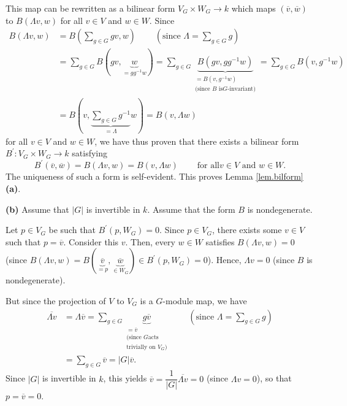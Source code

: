 \documentclass
[numbers=enddot,12pt,final,onecolumn,german,notitlepage]{scrartcl}%
\theoremstyle{definition}
\begin{document}
This map can be rewritten as a bilinear form $V_{G}\times W_{G}\rightarrow k$
which maps $\left(  \overline{v},\overline{w}\right)  $ to $B\left(  \Lambda
v,w\right)  $ for all $v\in V$ and $w\in W$. Since
\begin{align*}
B\left(  \Lambda v,w\right)   &  =B\left(  \sum\limits_{g\in G}gv,w\right)
\ \ \ \ \ \ \ \ \ \ \left(  \text{since }\Lambda=\sum\limits_{g\in G}g\right)
\\
&  =\sum\limits_{g\in G}B\left(  gv,\underbrace{w}_{=gg^{-1}w}\right)
=\sum\limits_{g\in G}\underbrace{B\left(  gv,gg^{-1}w\right)  }%
_{\substack{=B\left(  v,g^{-1}w\right)  \\\text{(since }B\text{ is
}G\text{-invariant)}}}=\sum\limits_{g\in G}B\left(  v,g^{-1}w\right) \\
&  =B\left(  v,\underbrace{\sum\limits_{g\in G}g^{-1}}_{=\Lambda}w\right)
=B\left(  v,\Lambda w\right)
\end{align*}
for all $v\in V$ and $w\in W$, we have thus proven that there exists a
bilinear form $B^{\prime}:V_{G}\times W_{G}\rightarrow k$ satisfying%
\[
B^{\prime}\left(  \overline{v},\overline{w}\right)  =B\left(  \Lambda
v,w\right)  =B\left(  v,\Lambda w\right)  \ \ \ \ \ \ \ \ \ \ \text{for all
}v\in V\text{ and }w\in W\text{.}%
\]
The uniqueness of such a form is self-evident. This proves Lemma
\ref{lem.bilform} \textbf{(a)}.

\textbf{(b)} Assume that $\left\vert G\right\vert $ is invertible in $k$.
Assume that the form $B$ is nondegenerate.

Let $p\in V_{G}$ be such that $B^{\prime}\left(  p,W_{G}\right)  =0$. Since
$p\in V_{G}$, there exists some $v\in V$ such that $p=\overline{v}$. Consider
this $v$. Then, every $w\in W$ satisfies $B\left(  \Lambda v,w\right)  =0$
(since $B\left(  \Lambda v,w\right)  =B\left(  \underbrace{\overline{v}}%
_{=p},\underbrace{\overline{w}}_{\in W_{G}}\right)  \in B^{\prime}\left(
p,W_{G}\right)  =0$). Hence, $\Lambda v=0$ (since $B$ is nondegenerate).

But since the projection of $V$ to $V_{G}$ is a $G$-module map, we have
\begin{align*}
\overline{\Lambda v}  &  =\Lambda\overline{v}=\sum\limits_{g\in G}%
\underbrace{g\overline{v}}_{\substack{=\overline{v}\\\text{(since }G\text{
acts}\\\text{trivially on }V_{G}\text{)}}}\ \ \ \ \ \ \ \ \ \ \left(
\text{since }\Lambda=\sum\limits_{g\in G}g\right) \\
&  =\sum\limits_{g\in G}\overline{v}=\left\vert G\right\vert \overline{v}.
\end{align*}
Since $\left\vert G\right\vert $ is invertible in $k$, this yields
$\overline{v}=\dfrac{1}{\left\vert G\right\vert }\overline{\Lambda v}=0$
(since $\Lambda v=0$), so that $p=\overline{v}=0$.
\end{document}
